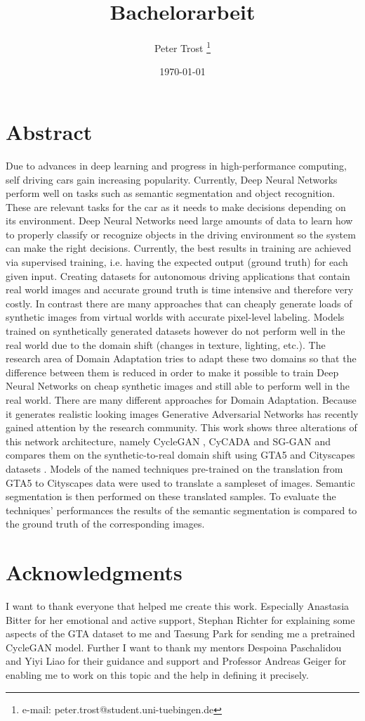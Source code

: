 \documentclass[a4paper,cleardoubleempty,BCOR1cm]{scrbook}
\title{Bachelorarbeit}
\author{Peter Trost \thanks{e-mail: peter.trost@student.uni-tuebingen.de}}
\date{\today}
\begin{document}


\chapter*{Abstract}
Due to advances in deep learning and progress in high-performance computing, self driving cars gain increasing popularity. Currently, Deep Neural Networks perform well on tasks such as semantic segmentation and object recognition. These are relevant tasks for the car as it needs to make decisions depending on its environment. Deep Neural Networks need large amounts of data to learn how to properly classify or recognize objects in the driving environment so the system can make the right decisions. Currently, the best results in training are achieved via supervised training, i.e. having the expected output (ground truth) for each given input. Creating datasets for autonomous driving applications that contain real world images and accurate ground truth is time intensive and therefore very costly. In contrast there are many approaches that can cheaply generate loads of synthetic images from virtual worlds with accurate pixel-level labeling. Models trained on synthetically generated datasets however do not perform well in the real world due to the domain shift (changes in texture, lighting, etc.). The research area of Domain Adaptation tries to adapt these two domains so that the difference between them is reduced in order to make it possible to train Deep Neural Networks on cheap synthetic images and still able to perform well in the real world. There are many different approaches for Domain Adaptation. Because it generates realistic looking images Generative Adversarial Networks \cite{NIPS2014_5423} has recently gained attention by the research community. This work shows three alterations of this network architecture, namely CycleGAN \cite{DBLP:journals/corr/ZhuPIE17}, CyCADA \cite{DBLP:journals/corr/abs-1711-03213} and SG-GAN \cite{DBLP:journals/corr/abs-1801-01726} and compares them on the synthetic-to-real domain shift using GTA5 \cite{Richter_2016_ECCV} and Cityscapes datasets \cite{Cordts_2016_CVPR}. Models of the named techniques pre-trained on the translation from GTA5 to Cityscapes data were used to translate a sampleset of images. Semantic segmentation is then performed on these translated samples. To evaluate the techniques' performances the results of the semantic segmentation is compared to the ground truth of the corresponding images.


\chapter*{Acknowledgments}
I want to thank everyone that helped me create this work. Especially Anastasia Bitter for her emotional and active support, Stephan Richter for explaining some aspects of the GTA dataset to me and Taesung Park for sending me a pretrained CycleGAN model. Further I want to thank my mentors Despoina Paschalidou and Yiyi Liao for their guidance and support and Professor Andreas Geiger for enabling me to work on this topic and the help in defining it precisely.
\end{document}
